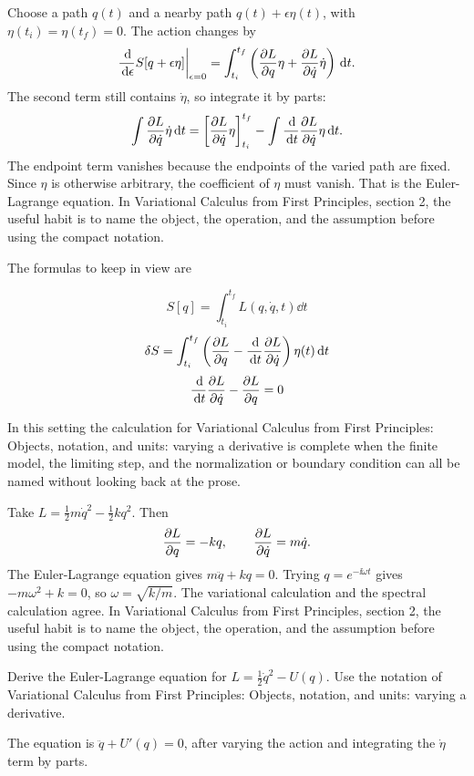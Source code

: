 Choose a path \(q(t)\) and a nearby path \(q(t)+\epsilon\eta(t)\), with \(\eta(t_i)=\eta(t_f)=0\).  The action changes by
\[
  \frac{\,\mathrm d}{\,\mathrm d\epsilon}S[q+\epsilon\eta]\bigg|_{\epsilon=0}
  =
  \int_{t_i}^{t_f}
  \left(
  \frac{\partial L}{\partial q}\eta+\frac{\partial L}{\partial\dot q}\dot\eta
  \right)\,\mathrm d t.
\]
The second term still contains \(\dot\eta\), so integrate it by parts:
\[
  \int \frac{\partial L}{\partial\dot q}\dot\eta\,\mathrm d t
  =
  \left[\frac{\partial L}{\partial\dot q}\eta\right]_{t_i}^{t_f}
  -
  \int \frac{\,\mathrm d}{\,\mathrm d t}\frac{\partial L}{\partial\dot q}\eta\,\mathrm d t.
\]
The endpoint term vanishes because the endpoints of the varied path are fixed.  Since \(\eta\) is otherwise arbitrary, the coefficient of \(\eta\) must vanish.  That is the Euler-Lagrange equation.  In Variational Calculus from First Principles, section 2, the useful habit is to name the object, the operation, and the assumption before using the compact notation.

The formulas to keep in view are

\[
  S[q]=\int_{t_i}^{t_f}L(q,\dot q,t)\dd t
\]
\[
  \delta S=\int_{t_i}^{t_f}\left(\frac{\partial L}{\partial q}-\frac{\,\mathrm d}{\,\mathrm d t}\frac{\partial L}{\partial\dot q}\right)\eta(t)\,\mathrm d t
\]
\[
  \frac{\,\mathrm d}{\,\mathrm d t}\frac{\partial L}{\partial\dot q}-\frac{\partial L}{\partial q}=0
\]

In this setting the calculation for Variational Calculus from First Principles: Objects, notation, and units: varying a derivative is complete when the finite model, the limiting step, and the normalization or boundary condition can all be named without looking back at the prose.




\begin{example}
Take \(L=\frac12m\dot q^2-\frac12kq^2\).  Then
\[
  \frac{\partial L}{\partial q}=-kq,\qquad \frac{\partial L}{\partial\dot q}=m\dot q.
\]
The Euler-Lagrange equation gives \(m\ddot q+kq=0\).  Trying \(q=e^{-\ii\omega t}\) gives \(-m\omega^2+k=0\), so \(\omega=\sqrt{k/m}\).  The variational calculation and the spectral calculation agree.  In Variational Calculus from First Principles, section 2, the useful habit is to name the object, the operation, and the assumption before using the compact notation.
\end{example}



\begin{exercise}
Derive the Euler-Lagrange equation for \(L=\frac12\dot q^2-U(q)\).  Use the notation of Variational Calculus from First Principles: Objects, notation, and units: varying a derivative.
\begin{answer}
The equation is \(\ddot q+U'(q)=0\), after varying the action and integrating the \(\dot\eta\) term by parts.
\end{answer}
\end{exercise}

